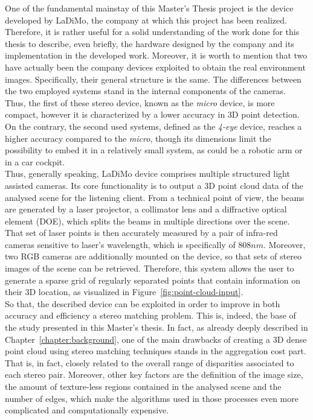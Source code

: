 One of the fundamental mainstay of this Master's Thesis project is the device developed by LaDiMo, the company at which this project has been realized.
Therefore, it is rather useful for a solid understanding of the work done for this thesis to describe, even briefly, the hardware designed by the company and its implementation in the developed work.
Moreover, it is worth to mention that two have actually been the company devices exploited to obtain the real environment images. 
Specifically, their general structure is the same. 
The differences between the two employed systems stand in the internal components of the cameras.
Thus, the first of these stereo device, known as the \textit{micro} device, is more compact, however it is characterized by a lower accuracy in 3D point detection.
On the contrary, the second used systems, defined as the \textit{4-eye} device, reaches a higher accuracy compared to the \textit{micro}, though its dimensions limit the possibility to embed it in a relatively small system, as could be a robotic arm or in a car cockpit.
\\
Thus, generally speaking, LaDiMo device comprises multiple structured light assisted cameras. 
Its core functionality is to output a 3D point cloud data of the analysed scene for the listening client. 
From a technical point of view, the beams are generated by a laser projector, a collimator lens and a diffractive optical element (DOE), which splits the beams in multiple directions over the scene.
That set of laser points is then accurately measured by a pair of infra-red cameras sensitive to laser's wavelength, which is specifically of $808 nm$.
Moreover, two RGB cameras are additionally mounted on the device, so that sets of stereo images of the scene can be retrieved.
Therefore, this system allows the user to generate a sparse grid of regularly separated points that contain information on their 3D location, as visualized in Figure~\ref{fig:point-cloud-input}. \\
So that, the described device can be exploited in order to improve in both accuracy and efficiency a stereo matching problem.
This is, indeed, the base of the study presented in this Master's thesis. 
In fact, as already deeply described in Chapter~\ref{chapter:background}, one of the main drawbacks of creating a 3D dense point cloud using stereo matching techniques stands in the aggregation cost part. 
That is, in fact, closely related to the overall range of disparities associated to each stereo pair. 
Moreover, other key factors are the definition of the image size, the amount of texture-less regions contained in the analysed scene and the number of edges, which make the algorithms used in those processes even more complicated and computationally expensive. 
